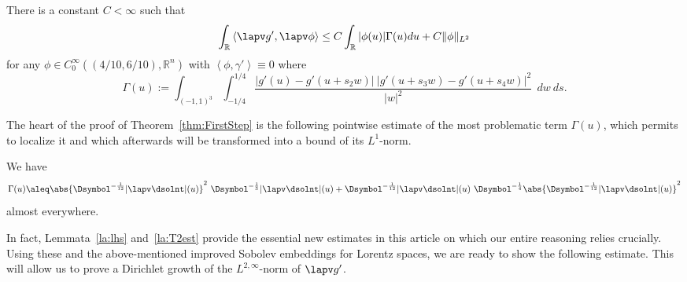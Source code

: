 %
\begin{lemma}\label{la:lhs}
  There is a constant $C < \infty$ such that 
  \begin{equation}\label{eq:el-est}
   \int_{\mathbb R} \left\langle \lapv g', \lapv   \phi \right \rangle 
   \leq C \int_{\mathbb R} |\phi(u)| \Gamma(u) du  + C \|\phi\|_{L^2}
  \end{equation}
 for any $\phi \in C^{\infty}_0 ((4/10,6/10), \mathbb R^n)$ with 
 $\left\langle\phi,\gamma'\right\rangle \equiv 0$ where
 \begin{equation*}
  \Gamma(u):= \int_{(-1,1)^3} \int_{-1/4}^{1/4} \frac{|g'(u)-g'(u+s_2 w)| \ 
  |g'(u+s_3 w)-g'(u+s_4 w)|^2} {|w|^2}\ \ dw\ ds.
 \end{equation*}
\end{lemma}


The heart of the proof of Theorem~\ref{thm:FirstStep} is the 
following pointwise estimate of the most problematic term $\Gamma(u)$, which permits to localize it and which afterwards will be transformed 
into a bound of its $L^1$-norm.



\begin{lemma}\label{la:T2est}
We have
\begin{equation}\label{eq:Gammauest}
 \Gamma(u) \aleq \abs{\Dsymbol^{-\frac{1}{12}} {\vert \lapv \dsolnt\vert}(u)}^2\ \Dsymbol^{-\frac{1}{3}}{\vert \lapv \dsolnt\vert}(u)+\Dsymbol^{-\frac{1}{12}} {\vert \lapv \dsolnt\vert}(u)\ \Dsymbol^{-\frac{1}{4}}\abs{\Dsymbol^{-\frac{1}{12}} {\vert \lapv \dsolnt\vert}(u)}^2
\end{equation}
almost everywhere.
\end{lemma}

In fact, Lemmata~\ref{la:lhs} and~\ref{la:T2est} provide the essential new estimates in this article
on which our entire reasoning relies crucially.
Using these and the above-mentioned improved Sobolev embeddings for
Lorentz spaces, we are ready to show the following estimate. This will allow us to 
prove a Dirichlet growth of the $L^{2, \infty}$-norm of $\lapv   g'$.

